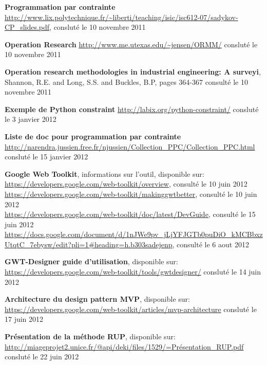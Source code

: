 \begin{thebibliography}{99}
\bibitem{}\textbf{Programmation par contrainte} \newline
\url{http://www.lix.polytechnique.fr/~liberti/teaching/isic/isc612-07/sadykov-CP_slides.pdf}, consluté le 10 novembre 2011

\bibitem{}\textbf{Operation Research} \newline
\url{http://www.me.utexas.edu/~jensen/ORMM/} consluté le 10 novembre 2011

\bibitem{} \textbf{Operation research methodologies in industrial engineering: A surveyi}, Shannon, R.E. and Long, S.S. and Buckles, B.P, pages 364-367 consulté le 10 novembre 2011

\bibitem{}\textbf{Exemple de Python constraint}  \newline
\url{http://labix.org/python-constraint/} consluté le 3 janvier 2012

\bibitem{}\textbf{Liste de doc pour programmation par contrainte} \newline
\url{http://narendra.jussien.free.fr/njussien/Collection_PPC/Collection_PPC.html} consluté le 15 janvier 2012

\bibitem{} \textbf{Google Web Toolkit}, informations sur l'outil, disponible sur:\newline
\url{https://developers.google.com/web-toolkit/overview}, consulté le 10 juin 2012\\
\url{https://developers.google.com/web-toolkit/makinggwtbetter}, consulté le 10 juin 2012\\
\url{https://developers.google.com/web-toolkit/doc/latest/DevGuide}, consulté le 15 juin 2012 \\
\url{https://docs.google.com/document/d/1nJWe9pv_jLjYFJGTb0puDiO_kMCBbxzUtqtC_7ebysw/edit?pli=1\#heading=h.b303sadejenp}, consulté le 6 aout 2012


\bibitem{}\textbf{GWT-Designer guide d'utilisation}, disponible sur:\newline
\url{https://developers.google.com/web-toolkit/tools/gwtdesigner/}  consluté le 14 juin 2012

\bibitem{}\textbf{Architecture du design pattern MVP}, disponible sur: \newline
\url{https://developers.google.com/web-toolkit/articles/mvp-architecture} consluté le 17 juin 2012

\bibitem{}\textbf{Présentation de la méthode RUP}, disponible sur: \newline
\url{http://miageprojet2.unice.fr/@api/deki/files/1529/=Présentation_RUP.pdf} consluté le 22 juin 2012


\end{thebibliography}
